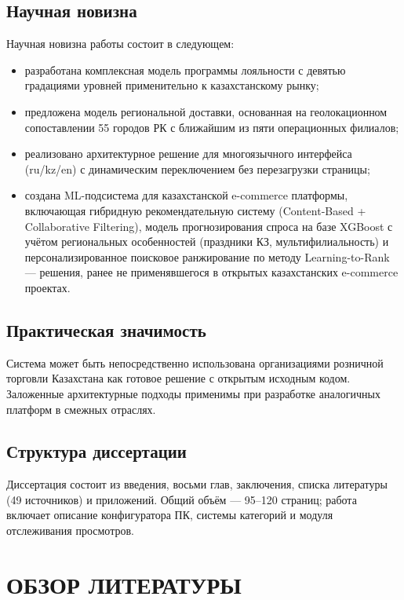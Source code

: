 \documentclass[14pt,a4paper]{extreport}
\begin{document}
\section{Научная новизна}

Научная новизна работы состоит в следующем:
\begin{itemize}
  \item разработана комплексная модель программы лояльности с девятью градациями уровней применительно к казахстанскому рынку;
  \item предложена модель региональной доставки, основанная на геолокационном сопоставлении 55 городов РК с ближайшим из пяти операционных филиалов;
  \item реализовано архитектурное решение для многоязычного интерфейса (ru/kz/en) с динамическим переключением без перезагрузки страницы;
  \item создана ML-подсистема для казахстанской e-commerce платформы, включающая гибридную рекомендательную систему (Content-Based + Collaborative Filtering), модель прогнозирования спроса на базе XGBoost с учётом региональных особенностей (праздники КЗ, мультифилиальность) и персонализированное поисковое ранжирование по методу Learning-to-Rank — решения, ранее не применявшегося в открытых казахстанских e-commerce проектах.
\end{itemize}

\section{Практическая значимость}

Система может быть непосредственно использована организациями розничной торговли Казахстана как готовое решение с открытым исходным кодом. Заложенные архитектурные подходы применимы при разработке аналогичных платформ в смежных отраслях.

\section{Структура диссертации}

Диссертация состоит из введения, восьми глав, заключения, списка литературы (49 источников) и приложений. Общий объём --- 95--120 страниц; работа включает описание конфигуратора ПК, системы категорий и модуля отслеживания просмотров.

\chapter{ОБЗОР ЛИТЕРАТУРЫ}
\end{document}
